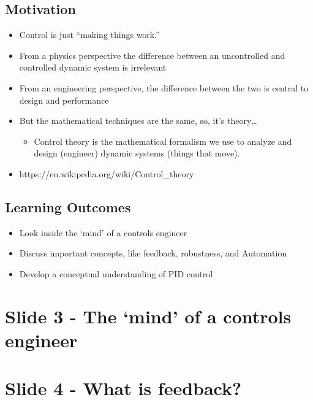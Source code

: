 \documentclass[
  letterpaper,
  DIV=11,
  numbers=noendperiod]{scrreprt}
\providecommand{\tightlist}{%
  \setlength{\itemsep}{0pt}\setlength{\parskip}{0pt}}
\begin{document}
\subsection{Motivation}\label{motivation}

\begin{itemize}
\tightlist
\item
  Control is just ``making things work.''
\item
  From a physics perspective the difference between an uncontrolled and
  controlled dynamic system is irrelevant
\item
  From an engineering perspective, the difference between the two is
  central to design and performance
\item
  But the mathematical techniques are the same, so, it's theory\ldots{}

  \begin{itemize}
  \tightlist
  \item
    Control theory is the mathematical formalism we use to analyze and
    design (engineer) dynamic systems (things that move).
  \end{itemize}
\item
  https://en.wikipedia.org/wiki/Control\_theory
\end{itemize}

\subsection{Learning Outcomes}\label{learning-outcomes}

\begin{itemize}
\tightlist
\item
  Look inside the `mind' of a controls engineer
\item
  Discuss important concepts, like feedback, robustness, and Automation
\item
  Develop a conceptual understanding of PID control
\end{itemize}

\section{Slide 3 - The `mind' of a controls
engineer}\label{slide-3---the-mind-of-a-controls-engineer}

\section{Slide 4 - What is feedback?}\label{slide-4---what-is-feedback}
\end{document}
